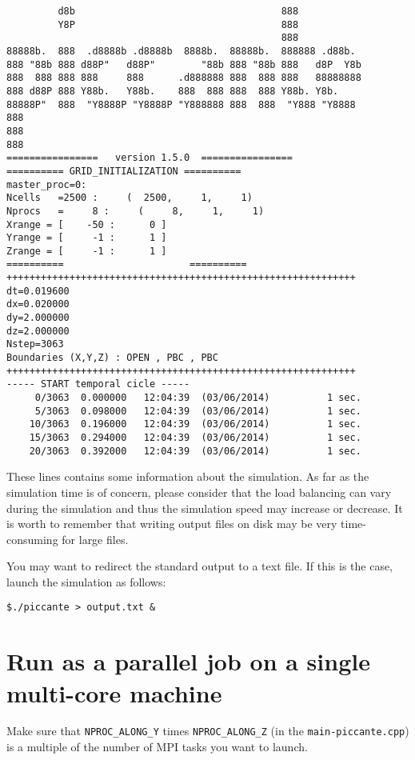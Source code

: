 \documentclass[11pt,a4paper]{report}
\begin{document}
\begin{verbatim}
         d8b                                    888                
         Y8P                                    888                
                                                888                
88888b.  888  .d8888b .d8888b  8888b.  88888b.  888888 .d88b.      
888 "88b 888 d88P"   d88P"        "88b 888 "88b 888   d8P  Y8b
888  888 888 888     888      .d888888 888  888 888   88888888     
888 d88P 888 Y88b.   Y88b.    888  888 888  888 Y88b. Y8b.         
88888P"  888  "Y8888P "Y8888P "Y888888 888  888  "Y888 "Y8888
888                                                                
888                                                                
888                                                                
================   version 1.5.0  ================
========== GRID_INITIALIZATION ==========
master_proc=0:
Ncells   =2500 :     (  2500,     1,     1)
Nprocs   =     8 :     (     8,     1,     1)
Xrange = [    -50 :      0 ]
Yrange = [     -1 :      1 ]
Zrange = [     -1 :      1 ]
==========                      ==========
+++++++++++++++++++++++++++++++++++++++++++++++++++++++++++++
dt=0.019600
dx=0.020000
dy=2.000000
dz=2.000000
Nstep=3063
Boundaries (X,Y,Z) : OPEN , PBC , PBC 
+++++++++++++++++++++++++++++++++++++++++++++++++++++++++++++
----- START temporal cicle -----
     0/3063  0.000000   12:04:39  (03/06/2014)          1 sec.
     5/3063  0.098000   12:04:39  (03/06/2014)          1 sec.
    10/3063  0.196000   12:04:39  (03/06/2014)          1 sec.
    15/3063  0.294000   12:04:39  (03/06/2014)          1 sec.
    20/3063  0.392000   12:04:39  (03/06/2014)          1 sec.
\end{verbatim}
These lines contains some information about the simulation. As far as the simulation time is of concern, please consider that the load balancing can vary during the simulation and thus the simulation speed may increase or decrease. It is worth to remember that writing output files on disk may be very time-consuming for large files.

You may want to redirect the standard output to a text file. If this is the case, launch the simulation as follows:
\begin{verbatim}
$./piccante > output.txt &
\end{verbatim}

\section{Run as a parallel job on a single multi-core machine}
Make sure that \verb+NPROC_ALONG_Y+ times  \verb+NPROC_ALONG_Z+ (in the \verb+main-piccante.cpp+) is a multiple of the number of MPI tasks you want to launch.
\end{document}
